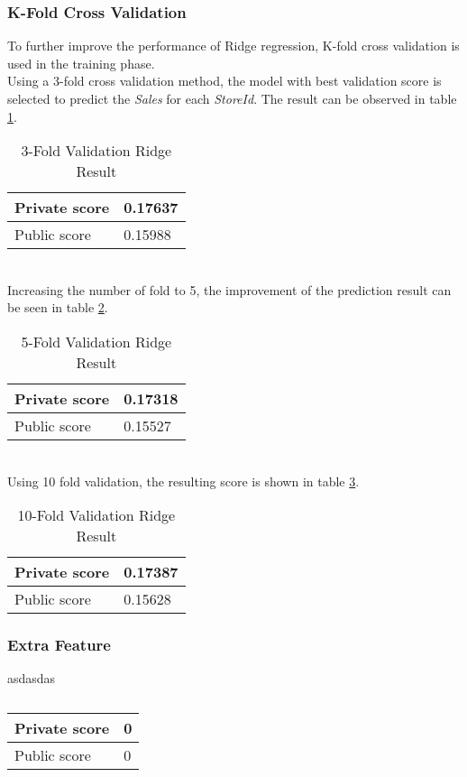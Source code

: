 \subsubsection{K-Fold Cross Validation}
To further improve the performance of Ridge regression, K-fold cross validation is used in the training phase.
\\
Using a 3-fold cross validation method, the model with best validation score is selected to predict the \textit{Sales} for each \textit{StoreId}. The result can be observed in table \ref{tab:ridge_3_fold}.
\begin{table}[h]
	\centering
	\caption{3-Fold Validation Ridge Result}
	\label{tab:ridge_3_fold}
	\begin{tabular}{|m{100pt}|m{50pt}|}
		\hline
		Private score & 0.17637 \\ \hline
		Public score  & 0.15988 \\ \hline
	\end{tabular}
\end{table}
\\
Increasing the number of fold to 5, the improvement of the prediction result can be seen in table \ref{tab:ridge_5_fold}.
\begin{table}[h]
	\centering
	\caption{5-Fold Validation Ridge Result}
	\label{tab:ridge_5_fold}
	\begin{tabular}{|m{100pt}|m{50pt}|}
		\hline
		Private score & 0.17318 \\ \hline
		Public score  & 0.15527 \\ \hline
	\end{tabular}
\end{table}
\\
Using 10 fold validation, the resulting score is shown in table \ref{tab:ridge_10_fold}.
\begin{table}[h]
	\centering
	\caption{10-Fold Validation Ridge Result}
	\label{tab:ridge_10_fold}
	\begin{tabular}{|m{100pt}|m{50pt}|}
		\hline
		Private score & 0.17387 \\ \hline
		Public score  & 0.15628 \\ \hline
	\end{tabular}
\end{table}

\subsubsection{Extra Feature}
asdasdas

\begin{table}[h]
	\centering
	\caption{}
	\label{}
	\begin{tabular}{|m{100pt}|m{50pt}|}
		\hline
		Private score & 0 \\ \hline
		Public score  & 0 \\ \hline
	\end{tabular}
\end{table}

